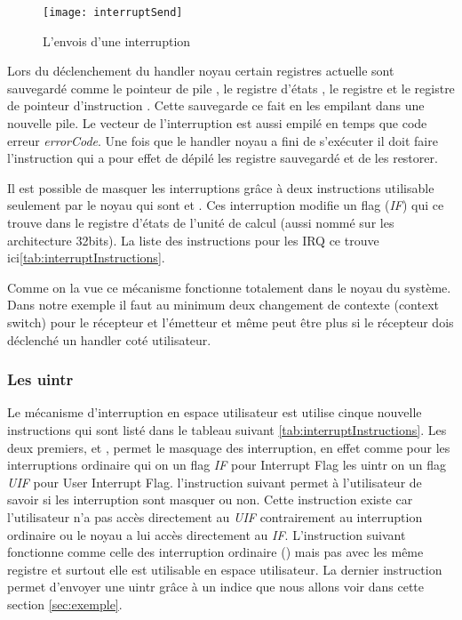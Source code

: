 \begin{figure}[H]
  \texttt{[image: interruptSend]}
  \caption{L'envois d'une interruption}
  \label{fig:sendInt}
\end{figure}

Lors du déclenchement du handler noyau certain registres actuelle sont sauvegardé comme le pointeur de pile , le registre d'états , le registre  et le registre de pointeur d'instruction .
Cette sauvegarde ce fait en les empilant dans une nouvelle pile. Le vecteur de l'interruption est aussi empilé en temps que code erreur \emph{errorCode}.
Une fois que le handler noyau a fini de s'exécuter il doit faire l'instruction  qui a pour effet de dépilé les registre sauvegardé et de les restorer.

Il est possible de masquer les interruptions grâce à deux instructions utilisable seulement par le noyau qui sont  et .
Ces interruption modifie un flag (\emph{IF}) qui ce trouve dans le registre d'états de l'unité de calcul  (aussi nommé  sur les architecture 32bits).
La liste des instructions pour les IRQ ce trouve ici\ref{tab:interruptInstructions}.

Comme on la vue ce mécanisme fonctionne totalement dans le noyau du système.
Dans notre exemple il faut au minimum deux changement de contexte (context switch) pour le récepteur et l'émetteur et même peut être plus si le récepteur dois déclenché un handler coté utilisateur.


\subsubsection{Les uintr}
\label{sec:uintrDetails}

Le mécanisme d'interruption en espace utilisateur est utilise cinque nouvelle instructions qui sont listé dans le tableau suivant \ref{tab:interruptInstructions}.
Les deux premiers,  et , permet le masquage des interruption, en effet comme pour les interruptions ordinaire qui on un flag \emph{IF} pour Interrupt Flag les uintr on un flag \emph{UIF} pour User Interrupt Flag.
l'instruction suivant  permet à l'utilisateur de savoir si les interruption sont masquer ou non.
Cette instruction existe car l'utilisateur n'a pas accès directement au \emph{UIF} contrairement au interruption ordinaire ou le noyau a lui accès directement au \emph{IF}.
L'instruction suivant  fonctionne comme celle des interruption ordinaire () mais pas avec les même registre et surtout elle est utilisable en espace utilisateur.
La dernier instruction permet d'envoyer une uintr grâce à un indice que nous allons voir dans cette section \ref{sec:exemple}.

